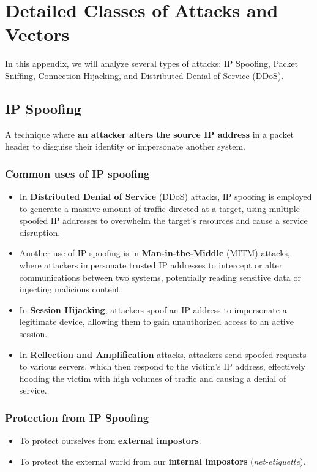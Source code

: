 \chapter{Detailed Classes of Attacks and Vectors}

In this appendix, we will analyze several types of attacks: IP Spoofing, Packet Sniffing, Connection Hijacking, and Distributed Denial of Service (DDoS).

\raggedright
\begin{center}
    \section{IP Spoofing} 
\end{center}
A technique where \textbf{an attacker alters the source IP address} in a packet header to disguise their identity or impersonate another system.

\subsection*{Common uses of IP spoofing}
\begin{itemize}
    \item In \textbf{Distributed Denial of Service} (DDoS) attacks, IP spoofing is employed to generate a massive amount of traffic directed at a target, using multiple spoofed IP addresses to overwhelm the target’s resources and cause a service disruption.

    \item Another use of IP spoofing is in \textbf{Man-in-the-Middle} (MITM) attacks, where attackers impersonate trusted IP addresses to intercept or alter communications between two systems, potentially reading sensitive data or injecting malicious content.

    \item In \textbf{Session Hijacking}, attackers spoof an IP address to impersonate a legitimate device, allowing them to gain unauthorized access to an active session.

    \item In \textbf{Reflection and Amplification} attacks, attackers send spoofed requests to various servers, which then respond to the victim’s IP address, effectively flooding the victim with high volumes of traffic and causing a denial of service.
\end{itemize}

\subsection*{Protection from IP Spoofing}
\begin{itemize}
    \item To protect ourselves from \textbf{external impostors}.
    \item To protect the external world from our \textbf{internal impostors} (\textit{net-etiquette}).
\end{itemize}


